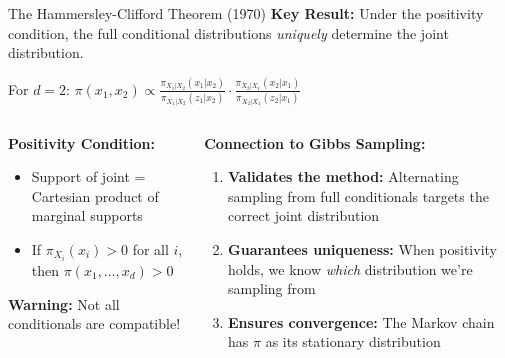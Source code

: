 \begin{frame}

\begin{block}{The Hammersley-Clifford Theorem (1970)}
\textbf{Key Result:} Under the \alert{positivity condition}, the full conditional distributions \textit{uniquely} determine the joint distribution.

\vspace{0.2cm}
For $d=2$: $\displaystyle \pi(x_1, x_2) \propto \frac{\pi_{X_1|X_2}(x_1|x_2)}{\pi_{X_1|X_2}(z_1|x_2)} \cdot \frac{\pi_{X_2|X_1}(x_2|x_1)}{\pi_{X_2|X_1}(z_2|x_1)}$
\end{block}

\vspace{0.3cm}

\begin{columns}[t]
\begin{column}{0.48\textwidth}
\textbf{Positivity Condition:}
\begin{itemize}
    \item Support of joint = Cartesian product of marginal supports
    \item If $\pi_{X_i}(x_i) > 0$ for all $i$, then $\pi(x_1,\ldots,x_d) > 0$
\end{itemize}

\vspace{0.2cm}

\textbf{Warning:} Not all conditionals are compatible!

\end{column}

\begin{column}{0.48\textwidth}
\textbf{Connection to Gibbs Sampling:}
\begin{enumerate}
    \item \textbf{Validates the method:} Alternating sampling from full conditionals targets the correct joint distribution
    \item \textbf{Guarantees uniqueness:} When positivity holds, we know \textit{which} distribution we're sampling from
    \item \textbf{Ensures convergence:} The Markov chain has $\pi$ as its stationary distribution
\end{enumerate}

\vspace{0.2cm}


\end{column}
\end{columns}
\end{frame}
